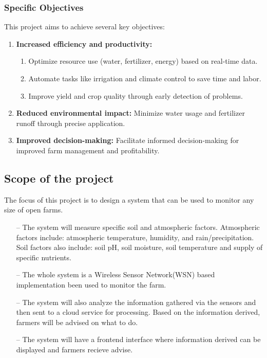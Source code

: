 \documentclass[12pt, a4paper]{article}
\begin{document}
\subsubsection{Specific Objectives}
This project aims to achieve several key objectives:\\
\begin{enumerate}
\item \textbf{Increased efficiency and productivity:}
\begin{enumerate}
 \item Optimize resource use (water, fertilizer, energy) based on real-time data.
 \item Automate tasks like irrigation and climate control to save time and labor.
 \item Improve yield and crop quality through early detection of problems.
\end{enumerate}
 
\item \textbf{Reduced environmental impact:} Minimize water usage and fertilizer runoff through precise application.\\
\item \textbf{Improved decision-making:} Facilitate informed decision-making for improved farm management and profitability.
\end{enumerate}

\newpage
\subsection{Scope of the project}
The focus of this project is to design a system that can be used to monitor any size of open farms.
\begin{itemize}
\item[--] The system will measure specific soil and atmospheric factors. Atmospheric factors include: atmospheric temperature, humidity, and rain/precipitation. Soil factors also include: soil pH, soil moisture, soil temperature and supply of specific nutrients.
\item[--] The whole system is a Wireless Sensor Network(WSN) based implementation been used to  monitor the farm.
\item[--] The system will also analyze the information gathered via the sensors and then sent to a cloud service for processing. Based on the information derived, farmers will be advised on what to do.
\item[--] The system will have a frontend interface where information derived can be displayed and farmers recieve advise.
\end{itemize}
\end{document}
